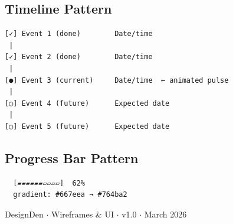 \documentclass[a4paper,11pt]{article}
\begin{document}
\subsection{Timeline Pattern}
\begin{lstlisting}
[✓] Event 1 (done)        Date/time
 |
[✓] Event 2 (done)        Date/time
 |
[●] Event 3 (current)     Date/time  ← animated pulse
 |
[○] Event 4 (future)      Expected date
 |
[○] Event 5 (future)      Expected date
\end{lstlisting}

\subsection{Progress Bar Pattern}
\begin{lstlisting}
  [▰▰▰▰▰▰▱▱▱▱]  62%
  gradient: #667eea → #764ba2
\end{lstlisting}

\vfill
\begin{center}
  \small\textcolor{muted}{DesignDen $\cdot$ Wireframes \& UI $\cdot$ v1.0 $\cdot$ March 2026}
\end{center}
\end{document}

